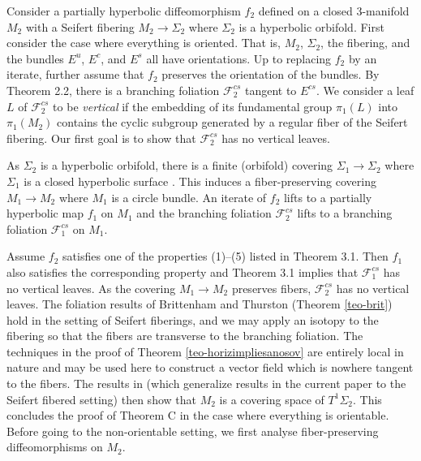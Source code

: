 \documentclass[11pt]{amsart} %
\makeatletter
\newcommand{\Es}{E^s}
\newcommand{\Ec}{E^c}
\newcommand{\Eu}{E^u}
\newcommand{\Ecs}{E^{cs}}
\newcommand{\Fcs}{\mathcal{F}^{cs}}
\newcommand{\Sig}{\Sigma}
\newcommand{\UTSig}{T^1 \Sig}
\newcommand{\simpleCD}[9]{
\ensuremath{
\begin{CD}
#1 @>#2>> #3 \\
@VV#4V  @VV#6V \\
#7 @>#8>> #9
}
\end{CD}
}
\newcommand{\id}{\operatorname{id}}
\numberwithin{equation}{section}
\theoremstyle{remark}
\makeatother
\begin{document}
Consider a partially hyperbolic diffeomorphism $f_2$ defined
on a closed 3-mani\-fold $M_2$ with a Seifert fibering $M_2  \to  \Sig_2$
where $\Sig_2$ is a hyperbolic orbifold.
First consider the case where everything is oriented.
That is, $M_2$, $\Sig_2$, the fibering, and the bundles $\Eu$, $\Ec$, and $\Es$ all have
orientations.
Up to replacing $f_2$ by an iterate, further assume that
$f_2$ preserves the orientation of the bundles.
By Theorem 2.2,
there is a branching foliation $\Fcs_2$ tangent to $\Ecs$.
We consider a leaf $L$ of $\Fcs_2$ to be \emph{vertical} if the embedding of its
fundamental group $\pi_1(L)$ into $\pi_1(M_2)$ contains the cyclic subgroup
generated by a regular fiber of the Seifert fibering.
Our first goal is to show that $\Fcs_2$ has no vertical leaves.

As $\Sig_2$ is a hyperbolic orbifold,
there is a finite (orbifold) covering $\Sig_1  \to  \Sig_2$
where $\Sig_1$ is a closed hyperbolic surface
\cite[Theorem 5.1.5]{cho2012geometric}.
This induces a fiber-preserving covering
$M_1  \to  M_2$ where $M_1$ is a circle bundle.
An iterate of $f_2$ lifts to a partially
hyperbolic map $f_1$ on $M_1$
and
the branching foliation $\Fcs_2$ lifts to a branching foliation $\Fcs_1$
on $M_1$.

Assume $f_2$ satisfies one of the properties (1)--(5) listed in Theorem 3.1.
Then $f_1$ also satisfies the corresponding property
and Theorem 3.1 implies that $\Fcs_1$ has no vertical leaves.
As the covering $M_1  \to  M_2$ preserves fibers,
$\Fcs_2$ has no vertical leaves.
The foliation results of Brittenham and Thurston (Theorem \ref{teo-brit})
hold in the setting of Seifert fiberings, and
we may apply an isotopy to the fibering
so that the fibers are transverse to the branching foliation.
The techniques in the proof of Theorem \ref{teo-horizimpliesanosov}
are entirely local in nature
and may be used here to construct a vector field
which is nowhere tangent to the fibers.
The results in \cite{ham20XXhorizontal}
(which generalize results in the current paper to the Seifert fibered setting)
then show that $M_2$ is a covering space of $\UTSig_2$.
%
This concludes the proof of Theorem C in the case where everything is
orientable.
Before going to the non-orientable setting, we first analyse
fiber-pre\-ser\-ving
diffeomorphisms on $M_2$.
\end{document}
